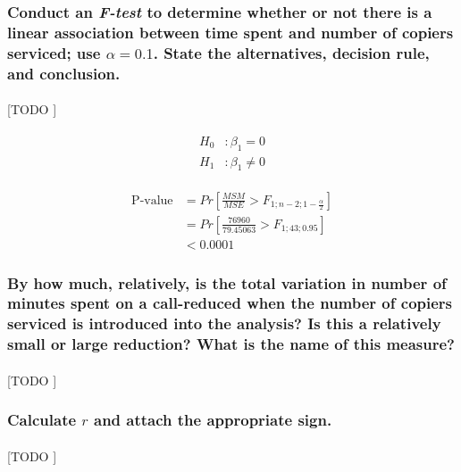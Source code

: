 \documentclass{article}
\begin{document}
      \setcounter{subsubsection}{1}
      \subsubsection{Conduct an \emph{F-test} to determine whether or not there is a linear association between time spent and number of copiers serviced; use $\alpha = 0.1$. State the alternatives, decision rule, and conclusion.}

        \paragraph{}
        [TODO ]

        \begin{align}
          \begin{split}
            H_0&: \beta_1 = 0 \\
            H_1&: \beta_1 \neq 0
          \end{split}
        \end{align}

        \begin{align}
          \text{P-value} &= Pr\left[\frac{MSM}{MSE} > F_{1;n-2;1-\frac{\alpha}{2}}\right] \\
          &= Pr\left[\frac{76960}{79.45063} > F_{1;43;0.95}\right] \\
          &< 0.0001
        \end{align}

      \subsubsection{By how much, relatively, is the total variation in number of minutes spent on a call-reduced when the number of copiers serviced is introduced into the analysis? Is this a relatively small or large reduction? What is the name of this measure?}

        \paragraph{}
        [TODO ]

      \subsubsection{Calculate $r$ and attach the appropriate sign.}

        \paragraph{}
        [TODO ]
\end{document}
